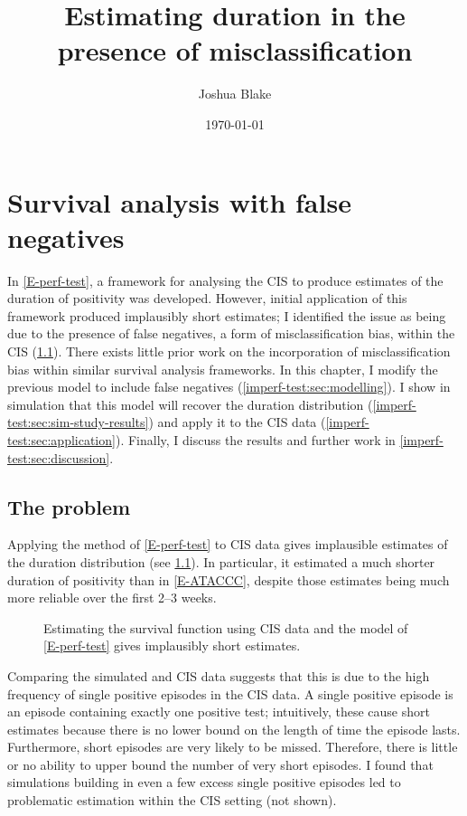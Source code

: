 \documentclass[thesis.tex]{subfiles}
\title{Estimating duration in the presence of misclassification}
\author{Joshua Blake}
\date{\today}
\begin{document}
\ifSubfilesClassLoaded{
  \setcounter{chapter}{5}
}

\chapter{Survival analysis with false negatives} \label{imperf-test}

In \cref{E-perf-test}, a framework for analysing the CIS to produce estimates of the duration of positivity was developed.
However, initial application of this framework produced implausibly short estimates; I identified the issue as being due to the presence of false negatives, a form of misclassification bias, within the CIS (\cref{imperf-test:sec:problem}).
There exists little prior work on the incorporation of misclassification bias within similar survival analysis frameworks.
In this chapter, I modify the previous model to include false negatives (\cref{imperf-test:sec:modelling}).
I show in simulation that this model will recover the duration distribution (\cref{imperf-test:sec:sim-study-results}) and apply it to the CIS data (\cref{imperf-test:sec:application}).
Finally, I discuss the results and further work in \cref{imperf-test:sec:discussion}.

\section{The problem} \label{imperf-test:sec:problem}

Applying the method of \cref{E-perf-test} to CIS data gives implausible estimates of the duration distribution (see \cref{imperf-test:fig:problem-cis-estimates}).
In particular, it estimated a much shorter duration of positivity than in \cref{E-ATACCC}, despite those estimates being much more reliable over the first 2--3 weeks.
\begin{figure}
  \centering %
  \caption[Estimating survival using CIS data assuming perfect testing]{Estimating the survival function using CIS data and the model of \cref{E-perf-test} gives implausibly short estimates. \label{imperf-test:fig:problem-cis-estimates}}
\end{figure}

Comparing the simulated and CIS data suggests that this is due to the high frequency of single positive episodes in the CIS data.
A single positive episode is an episode containing exactly one positive test; intuitively, these cause short estimates because there is no lower bound on the length of time the episode lasts.
Furthermore, short episodes are very likely to be missed.
Therefore, there is little or no ability to upper bound the number of very short episodes.
I found that simulations building in even a few excess single positive episodes led to problematic estimation within the CIS setting (not shown).
\end{document}
